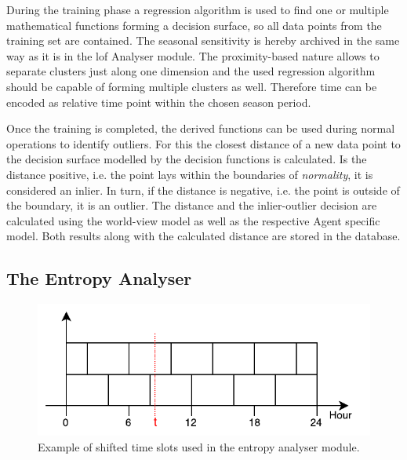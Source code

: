 During the training phase a regression algorithm is used to find one or multiple mathematical functions forming a decision surface, so all data points from the training set are contained.
The seasonal sensitivity is hereby archived in the same way as it is in the \gls{lof} Analyser module. The proximity-based nature allows to separate clusters just along one dimension and the used regression algorithm should be capable of forming multiple clusters as well. Therefore time can be encoded as relative time point within the chosen season period.

Once the training is completed, the derived functions can be used during normal operations to identify outliers.
For this the closest distance of a new data point to the decision surface modelled by the decision functions is calculated.
Is the distance positive, i.e. the point lays within the boundaries of \emph{normality}, it is considered an inlier.
In turn, if the distance is negative, i.e. the point is outside of the boundary, it is an outlier.
The distance and the inlier-outlier decision are calculated using the world-view model as well as the respective Agent specific model.
Both results along with the calculated distance are stored in the database.

\subsection{The Entropy Analyser}
\label{sec:concept:anal:entropy}

\begin{figure}[h]
	\centering
	\includegraphics[]{figures/300-time-slots.pdf}
	\caption{Example of shifted time slots used in the entropy analyser module.}
	\label{fig:concept:time-slots}
\end{figure}

